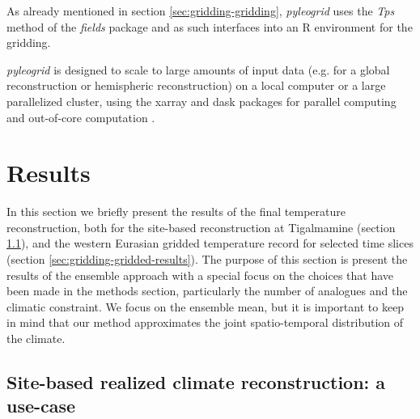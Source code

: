 \begin{refsection}
As already mentioned in section \ref{sec:gridding-gridding}, \textit{pyleogrid} uses the \textit{Tps} method of the \textit{fields} package \citep{NychkaFurrerPaigeEtAl2017} and as such interfaces into an R environment for the gridding.

\textit{pyleogrid} is designed to scale to large amounts of input data (e.g. for a global reconstruction or hemispheric reconstruction) on a local computer or a large parallelized cluster, using the xarray and dask packages for parallel computing and out-of-core computation \citep{HoyerHamman2017, DDT2016}.

\section{Results}  \label{sec:gridding-results}
In this section we briefly present the results of the final temperature reconstruction, both for the site-based reconstruction at Tigalmamine (section \ref{sec:gridding-site}), and the western Eurasian gridded temperature record for selected time slices (section \ref{sec:gridding-gridded-results}). The purpose of this section is present the results of the ensemble approach with a special focus on the choices that have been made in the methods section, particularly the number of analogues and the climatic constraint. We focus on the ensemble mean, but it is important to keep in mind that our method approximates the joint spatio-temporal distribution of the climate.

\subsection{Site-based realized climate reconstruction: a use-case} \label{sec:gridding-site}


\end{refsection}
